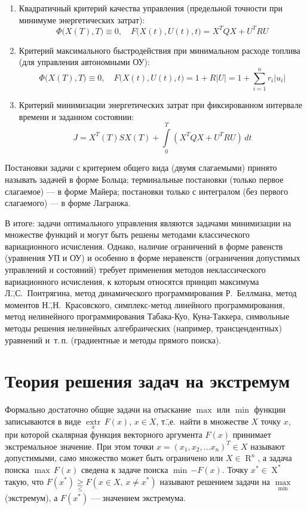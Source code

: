 \documentclass[preprint,russian,a5paper,10pt,twoside,mediummath]{ncc}
\begin{document}
\begin{enumerate}[resume]
\item Квадратичный критерий качества управления (предельной точности при минимуме энергетических затрат):
\[ \Phi \bigl( X(T), T \bigr) \equiv 0, \quad F \bigl( X(t), U(t), t \bigr) = X^TQX + U^TRU \]
\item Критерий максимального быстродействия при минимальном расходе топлива (для управления автономными ОУ):
\[ \Phi \bigl( X(T), T \bigr) \equiv 0, \quad F \bigl( X(t), U(t), t \bigr) = 1 + R\left|U\right| = 1 + \sum\limits_{i=1}^{n}{ r_i \left| u_i \right| } \]
\item Критерий минимизации энергетических затрат при фиксированном интервале времени и заданном состоянии: 
\[ J = X^T \left( T \right) S X \left( T \right) + \int\limits_0^T \left( X^TQX + U^TRU \right) \, dt \] 
\end{enumerate}

Постановки задачи с критерием общего вида (двумя слагаемыми) принято называть задачей в форме Больца; терминальные постановки (только первое слагаемое) --- в форме Майера; постановки только с интегралом (без первого слагаемого) --- в форме Лагранжа.

В итоге: задачи оптимального управления являются задачами минимизации на множестве функций и могут быть решены методами классического вариационного исчисления. Однако, наличие ограничений в форме равенств (уравнения УП и ОУ) и особенно в форме неравенств (ограничения допустимых управлений и состояний) требует применения методов неклассического вариационного исчисления, к которым относятся принцип максимума Л.\=,С.~Понтрягина, метод динамического программирования Р.~Беллмана, метод моментов Н.\=,Н.~Красовского, симплекс-метод линейного программирования, метод нелинейного программирования Табака-Куо, Куна-Таккера, символьные методы решения нелинейных алгебраических (например, трансцендентных) уравнений и~т.\,п. (градиентные и методы прямого поиска).


\clearpage
\section{Теория решения задач на экстремум\label{extremum}}
Формально достаточно общие задачи на отыскание $\max$  или $\min$ функции записываются в виде $\underset{x}{\mathop{extr}} \, F \left( x \right) $, $ x \in X $, т.\=,е.~найти в множестве $X$ точку $x$, при которой скалярная функция векторного аргумента $F \left( x \right) $ принимает экстремальное значение. При этом точки $ x = {\left( x_1, x_2, \dots x_n \right)}^T \in X$ называют допустимыми, само множество может быть ограничено или $ X \in \mathop{R}^n $, а задача поиска $ \max \, F\left( x \right) $ сведена к задаче поиска $ \min \, { - F \left( x \right) }$. Точку $ x^* \in \mathop{X}^* $ такую, что $ F \left( x^* \right) \underset{\le}{\ge} F \left( x \in X, \, x \ne x^* \right) $ называют решением задачи на $ \underset{\min}{\max} $ (экстремум), а $ F \left( x^* \right) $ --- значением экстремума.
\end{document}

